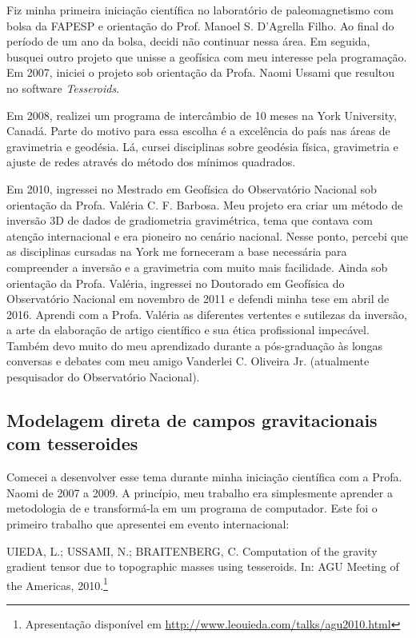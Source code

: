\documentclass[12pt,a4paper,oneside,titlepage,onecolumn]{article}
\begin{document}
Fiz minha primeira iniciação científica no laboratório de paleomagnetismo com
bolsa da FAPESP e orientação do Prof. Manoel S. D'Agrella Filho.
Ao final do período de um ano da bolsa, decidi não continuar nessa área.
Em seguida, busquei outro projeto que unisse a geofísica
com meu interesse pela programação.
Em 2007, iniciei o projeto sob orientação da
Profa. Naomi Ussami que resultou no software \textit{Tesseroids}.

Em 2008, realizei um programa de intercâmbio de 10 meses na York University,
Canadá.
Parte do motivo para essa escolha é a excelência do país nas áreas de
gravimetria e geodésia.
Lá, cursei disciplinas sobre geodésia física, gravimetria e ajuste de redes
através do método dos mínimos quadrados.

Em 2010, ingressei no Mestrado em Geofísica do Observatório Nacional sob
orientação da Profa. Valéria C. F. Barbosa.
Meu projeto era criar um método de inversão 3D de dados de gradiometria
gravimétrica, tema que contava com atenção internacional e era pioneiro no
cenário nacional.
Nesse ponto, percebi que as disciplinas cursadas na York me forneceram a base
necessária para compreender a inversão e a gravimetria com muito mais
facilidade.
Ainda sob orientação da Profa. Valéria, ingressei no Doutorado em Geofísica do
Observatório Nacional em novembro de 2011 e defendi minha tese em abril de
2016.
Aprendi com a Profa. Valéria
as diferentes vertentes e sutilezas da inversão,
a arte da elaboração de artigo científico
e sua ética profissional impecável.
Também devo muito do meu aprendizado durante a pós-graduação às longas
conversas e debates com meu amigo Vanderlei C. Oliveira Jr. (atualmente
pesquisador do Observatório Nacional).



\subsection{Modelagem direta de campos gravitacionais com tesseroides}

Comecei a desenvolver esse tema durante minha iniciação científica com a
Profa. Naomi de 2007 a 2009.
A princípio, meu trabalho era simplesmente aprender a metodologia de
\citet{wild-pfeiffer2008} e transformá-la em um programa de computador.
Este foi o primeiro trabalho que apresentei em evento internacional:

\begin{displayquote}
    UIEDA, L.; USSAMI, N.; BRAITENBERG, C. Computation of the gravity
    gradient tensor due to topographic masses using tesseroids. In: AGU Meeting
    of the Americas, 2010.\footnote{Apresentação disponível em
    \url{http://www.leouieda.com/talks/agu2010.html}}
\end{displayquote}
\end{document}
